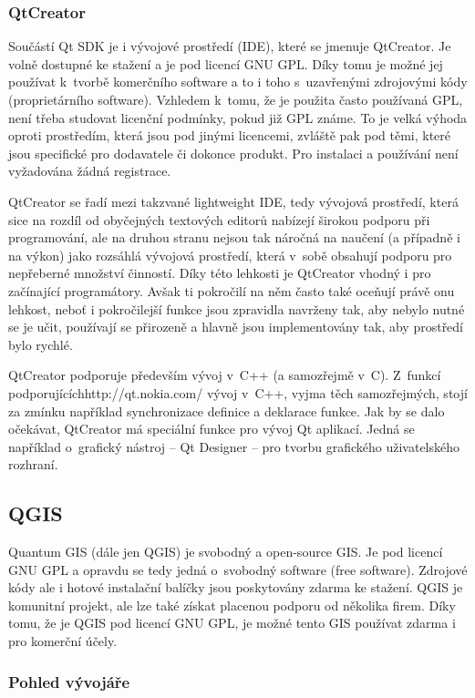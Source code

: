 \documentclass[a4paper,10pt]{article}
\begin{document}
\subsubsection{QtCreator}
Součástí Qt SDK je i vývojové prostředí (IDE), které se jmenuje QtCreator.
Je volně dostupné ke stažení a je pod licencí GNU GPL.
Díky tomu je možné jej používat k~tvorbě komerčního software a to i toho s~uzavřenými zdrojovými kódy (proprietárního software).
Vzhledem k~tomu, že je použita často používaná GPL, není třeba studovat licenční podmínky, pokud již GPL známe.
To je velká výhoda oproti prostředím, která jsou pod jinými licencemi, zvláště pak pod těmi, které jsou specifické pro dodavatele či dokonce produkt.
Pro instalaci a používání není vyžadována žádná registrace.

QtCreator se řadí mezi takzvané lightweight IDE, tedy vývojová prostředí, která sice na rozdíl od obyčejných textových editorů nabízejí širokou podporu při programování,
ale na druhou stranu nejsou tak náročná na naučení (a případně i na výkon) jako rozsáhlá vývojová prostředí, která v~sobě obsahují podporu pro nepřeberné množství činností.
Díky této lehkosti je QtCreator vhodný i pro začínající programátory.
Avšak ti pokročilí na něm často také oceňují právě onu lehkost, neboť i pokročilejší funkce jsou zpravidla navrženy tak,
aby nebylo nutné se je učit, používají se přirozeně a hlavně jsou implementovány tak, aby prostředí bylo rychlé.

QtCreator podporuje především vývoj v~C++ (a samozřejmě v~C).
Z~funkcí podporujícíchhttp://qt.nokia.com/ vývoj v~C++, vyjma těch samozřejmých, stojí za zmínku například synchronizace definice a deklarace funkce.
Jak by se dalo očekávat, QtCreator má speciální funkce pro vývoj Qt aplikací.
Jedná se například o~grafický nástroj -- Qt Designer -- pro tvorbu grafického uživatelského rozhraní.

\subsection{QGIS}
Quantum GIS (dále jen QGIS) je svobodný a open-source GIS.
Je pod licencí GNU GPL a opravdu se tedy jedná o~svobodný software (free software).
Zdrojové kódy ale i hotové instalační balíčky jsou poskytovány zdarma ke stažení.
QGIS je komunitní projekt, ale lze také získat placenou podporu od několika firem.
Díky tomu, že je QGIS pod licencí GNU GPL, je možné tento GIS používat zdarma i pro komerční účely.

\subsubsection{Pohled vývojáře}
\end{document}
